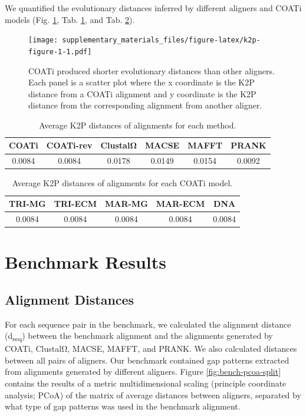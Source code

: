 \documentclass[
]{article}
\begin{document}
We quantified the evolutionary distances inferred by different aligners and COATi models (Fig. \ref{fig:k2p-figure-1}, Tab. \ref{tab:k2p-table-1}, and Tab. \ref{tab:k2p-table-2}).

\begin{figure}
\centering
\texttt{[image: supplementary\_materials\_files/figure-latex/k2p-figure-1-1.pdf]}
\caption{\label{fig:k2p-figure-1}COATi produced shorter evolutionary distances than other aligners. Each panel is a scatter plot where the x coordinate is the K2P distance from a COATi alignment and y coordinate is the K2P distance from the corresponding alignment from another aligner.}
\end{figure}

\begin{table}[H]

\caption{\label{tab:k2p-table-1}Average K2P distances of alignments for each method.}
\centering
\begin{tabular}[t]{cccccc}
\toprule
COATi & COATi-rev & ClustalΩ & MACSE & MAFFT & PRANK\\
\midrule
0.0084 & 0.0084 & 0.0178 & 0.0149 & 0.0154 & 0.0092\\
\bottomrule
\end{tabular}
\end{table}

\begin{table}[H]

\caption{\label{tab:k2p-table-2}Average K2P distances of alignments for each COATi model.}
\centering
\begin{tabular}[t]{ccccc}
\toprule
TRI-MG & TRI-ECM & MAR-MG & MAR-ECM & DNA\\
\midrule
0.0084 & 0.0084 & 0.0084 & 0.0084 & 0.0084\\
\bottomrule
\end{tabular}
\end{table}

\hypertarget{benchmark-results}{%
\section{Benchmark Results}\label{benchmark-results}}

\hypertarget{alignment-distances}{%
\subsection{Alignment Distances}\label{alignment-distances}}

For each sequence pair in the benchmark, we calculated the alignment distance (d\textsubscript{seq}) between the benchmark alignment and the alignments generated by COATi, ClustalΩ, MACSE, MAFFT, and PRANK. We also calculated distances between all pairs of aligners. Our benchmark contained gap patterns extracted from alignments generated by different aligners. Figure \ref{fig:bench-pcoa-split} contains the results of a metric multidimensional scaling (principle coordinate analysis; PCoA) of the matrix of average distances between aligners, separated by what type of gap patterns was used in the benchmark alignment.
\end{document}
